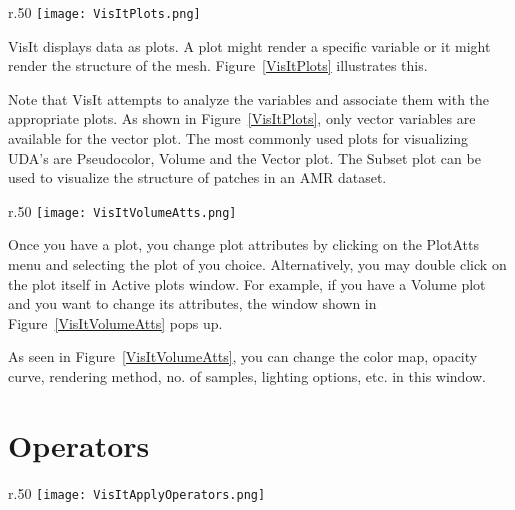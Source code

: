\begin{wrapfigure}{r}{.50\textwidth}
  \vspace{-65pt}
  \center
  \texttt{[image: VisItPlots.png]}
  \vspace{-10pt}
  \caption{Various plots in VisIt}
  \vspace{-50pt}
  \label{VisItPlots}
\end{wrapfigure}


VisIt displays data as plots. A plot might render a specific variable
or it might render the structure of the mesh. Figure~\ref{VisItPlots}
illustrates this.


Note that VisIt attempts to analyze the variables and associate them
with the appropriate plots. As shown in Figure~\ref{VisItPlots}, only
vector variables are available for the vector plot. The most commonly
used plots for visualizing UDA's are Pseudocolor, Volume and the
Vector plot. The Subset plot can be used to visualize the structure of
patches in an AMR dataset.

\begin{wrapfigure}{r}{.50\textwidth}
  \vspace{-20pt}
  \center
  \texttt{[image: VisItVolumeAtts.png]}
  \vspace{-10pt}
  \caption{Volume plot attributes in VisIt}
  \vspace{-40pt}
  \label{VisItVolumeAtts}
\end{wrapfigure}


Once you have a plot, you change plot attributes by clicking on the
PlotAtts menu and selecting the plot of you choice. Alternatively, you
may double click on the plot itself in Active plots window. For
example, if you have a Volume plot and you want to change its
attributes, the window shown in Figure~\ref{VisItVolumeAtts} pops up.



As seen in Figure~\ref{VisItVolumeAtts}, you can change the color map,
opacity curve, rendering method, no. of samples, lighting options,
etc. in this window.



\section{Operators}

\begin{wrapfigure}{r}{.50\textwidth}
  \vspace{-20pt}
  \center
  \texttt{[image: VisItApplyOperators.png]}
  \vspace{-10pt}
  \caption{Unchecking "selection to all plots"}
  \vspace{-10pt}
  \label{VisItApplyOperators}
\end{wrapfigure}


